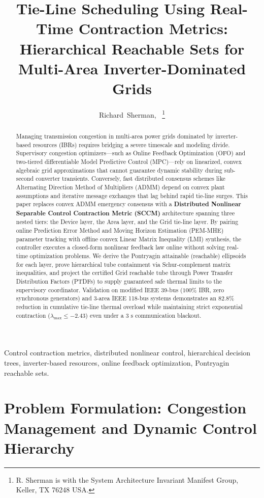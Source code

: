 \documentclass[journal]{IEEEtran}
\title{Tie-Line Scheduling Using Real-Time Contraction Metrics: Hierarchical Reachable Sets for Multi-Area Inverter-Dominated Grids}
\author{Richard~Sherman,~\IEEEmembership{Member,~IEEE}%
\thanks{R. Sherman is with the System Architecture Invariant Manifest Group, Keller, TX 76248 USA.}}
\begin{document}
\maketitle

\begin{abstract}
Managing transmission congestion in multi-area power grids dominated by inverter-based resources (IBRs) requires bridging a severe timescale and modeling divide. Supervisory congestion optimizers—such as Online Feedback Optimization (OFO) and two-tiered differentiable Model Predictive Control (MPC)—rely on linearized, convex algebraic grid approximations that cannot guarantee dynamic stability during sub-second converter transients. Conversely, fast distributed consensus schemes like Alternating Direction Method of Multipliers (ADMM) depend on convex plant assumptions and iterative message exchanges that lag behind rapid tie-line surges. This paper replaces convex ADMM emergency consensus with a \textbf{Distributed Nonlinear Separable Control Contraction Metric (SCCM)} architecture spanning three nested tiers: the Device layer, the Area layer, and the Grid tie-line layer. By pairing online Prediction Error Method and Moving Horizon Estimation (PEM-MHE) parameter tracking with offline convex Linear Matrix Inequality (LMI) synthesis, the controller executes a closed-form nonlinear feedback law online without solving real-time optimization problems. We derive the Pontryagin attainable (reachable) ellipsoids for each layer, prove hierarchical tube containment via Schur-complement matrix inequalities, and project the certified Grid reachable tube through Power Transfer Distribution Factors (PTDFs) to supply guaranteed safe thermal limits to the supervisory coordinator. Validation on modified IEEE 39-bus ($100\%$ IBR, zero synchronous generators) and 3-area IEEE 118-bus systems demonstrates an $82.8\%$ reduction in cumulative tie-line thermal overload while maintaining strict exponential contraction ($\lambda_{\max} \le -2.43$) even under a $3\text{ s}$ communication blackout.
\end{abstract}

\begin{IEEEkeywords}
Control contraction metrics, distributed nonlinear control, hierarchical decision trees, inverter-based resources, online feedback optimization, Pontryagin reachable sets.
\end{IEEEkeywords}

\section{Problem Formulation: Congestion Management and Dynamic Control Hierarchy}
\end{document}
